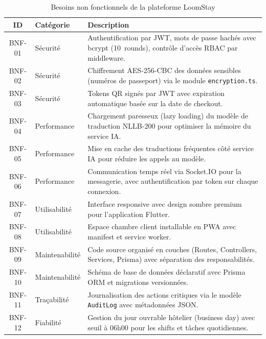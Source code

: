 \begin{table}[H]
\centering
\caption{Besoins non fonctionnels de la plateforme LoomStay}
\small
\begin{tabularx}{\textwidth}{|c|p{2.8cm}|X|}
\hline
\textbf{ID} & \textbf{Catégorie} & \textbf{Description} \\ \hline
BNF-01 & Sécurité & Authentification par JWT, mots de passe hachés avec bcrypt (10~rounds), contrôle d'accès RBAC par middleware. \\ \hline
BNF-02 & Sécurité & Chiffrement AES-256-CBC des données sensibles (numéros de passeport) via le module \texttt{encryption.ts}. \\ \hline
BNF-03 & Sécurité & Tokens QR signés par JWT avec expiration automatique basée sur la date de checkout. \\ \hline
BNF-04 & Performance & Chargement paresseux (lazy loading) du modèle de traduction NLLB-200 pour optimiser la mémoire du service IA. \\ \hline
BNF-05 & Performance & Mise en cache des traductions fréquentes côté service IA pour réduire les appels au modèle. \\ \hline
BNF-06 & Performance & Communication temps réel via Socket.IO pour la messagerie, avec authentification par token sur chaque connexion. \\ \hline
BNF-07 & Utilisabilité & Interface responsive avec design sombre premium pour l'application Flutter. \\ \hline
BNF-08 & Utilisabilité & Espace chambre client installable en PWA avec manifest et service worker. \\ \hline
BNF-09 & Maintenabilité & Code source organisé en couches (Routes, Controllers, Services, Prisma) avec séparation des responsabilités. \\ \hline
BNF-10 & Maintenabilité & Schéma de base de données déclaratif avec Prisma ORM et migrations versionnées. \\ \hline
BNF-11 & Traçabilité & Journalisation des actions critiques via le modèle \texttt{AuditLog} avec métadonnées JSON. \\ \hline
BNF-12 & Fiabilité & Gestion du jour ouvrable hôtelier (business day) avec seuil à 06h00 pour les shifts et tâches quotidiennes. \\ \hline
\end{tabularx}
\label{tab:besoins_non_fonctionnels}
\end{table}
\FloatBarrier

